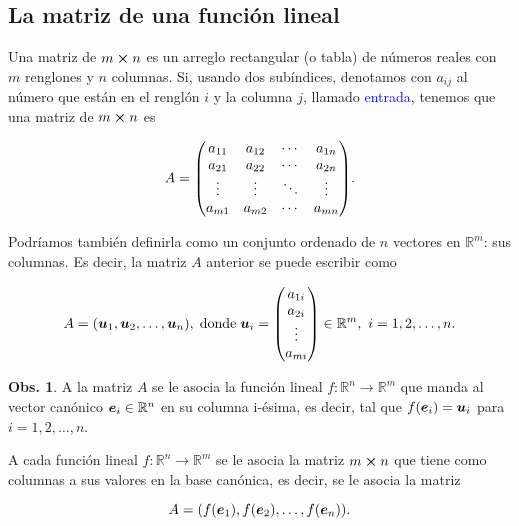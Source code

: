 \documentclass{article}
\theoremstyle{definicion}
\theoremstyle{definition}             %
\theoremstyle{definition}             %
\theoremstyle{definition}
\theoremstyle{definition}
\theoremstyle{observacion}
\newtheorem{obs}{Obs.}
\theoremstyle{definition}
\theoremstyle{plain}
\theoremstyle{definition}
\theoremstyle{afirmacion}
\theoremstyle{notation}
\theoremstyle{definition}
\begin{document}
    \subsection{La matriz de una función lineal}

    Una matriz de \(m \cross n\) es un arreglo rectangular (o tabla) de números reales con \(m\) renglones y \(n\) columnas. Si, usando dos subíndices, denotamos con \(a_{ij}\) al número que están en el renglón \(i\) y la columna \(j\), llamado \textcolor{blue}{entrada}, tenemos que una matriz de \(m \cross n\) es

    \begin{equation*}
        A = \mqty(a_{11} & a_{12} & \cdots & a_{1n}\\
        a_{21} & a_{22} & \cdots & a_{2n}\\
        \vdots & \vdots & \ddots & \vdots\\
        a_{m1} & a_{m2} & \cdots & a_{mn}).
    \end{equation*}

    Podríamos también definirla como un conjunto ordenado de \(n\) vectores en \(\mathbb{R}^{m}\): sus columnas. Es decir, la matriz \(A\) anterior se puede escribir como 

    \begin{equation*}
        A = (\vb*{u}_{1}, \vb*{u}_{2}, \dots, \vb*{u}_{n}), \; \text{donde}\; \vb*{u}_{i} = \mqty(a_{1i}\\ a_{2i}\\ \vdots\\ a_{mi})\in\mathbb{R}^{m},\ i = 1, 2, \dots, n.
    \end{equation*}

    \begin{obs}
        A la matriz \(A\) se le asocia la función lineal \(f \colon \mathbb{R}^{n}\to \mathbb{R}^{m}\) que manda al vector canónico \(\vb*{e}_{i} \in \mathbb{R}^{n}\) en su columna i-ésima, es decir, tal que \(f(\vb*{e}_{i}) = \vb*{u}_{i}\) para \(i = 1, 2, \dots, n\).
    \end{obs}

    A cada función lineal \(f \colon \mathbb{R}^{n} \to \mathbb{R}^{m}\)  se le asocia la matriz \(m \cross n\) que tiene como columnas a sus valores en la base canónica, es decir, se le asocia la matriz

    \begin{equation*}
        A = (f(\vb*{e}_{1}), f(\vb*{e}_{2}), \dots, f(\vb*{e}_{n})).
    \end{equation*}
\end{document}
